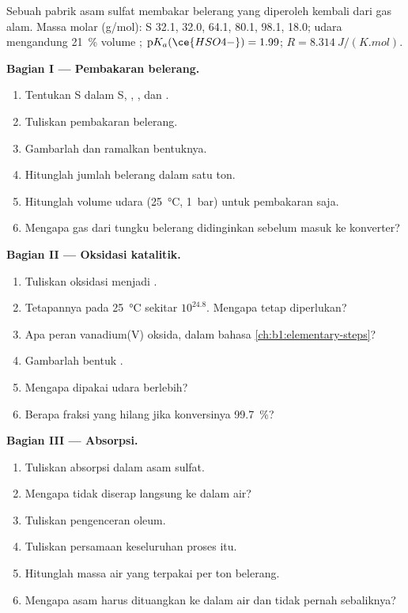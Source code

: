 \begin{problem}
\label{pb:b1:p-block-16-18:1}
Sebuah pabrik asam sulfat membakar belerang yang diperoleh kembali dari
gas alam. Massa molar (\unit{g/mol}): S 32.1,  32.0, 
64.1,  80.1,  98.1,  18.0; udara mengandung
\qty{21}{\percent} volume ; $\mathrm{p}K_a(\ce{HSO4-}) = 1.99$; $R =
\qty{8.314}{J/(K.mol)}$.

\medskip
\noindent\textbf{Bagian I --- Pembakaran belerang.}
\begin{enumerate}
  \item Tentukan  S dalam S, , , dan
        .
  \item Tuliskan pembakaran belerang.
  \item Gambarlah   dan ramalkan bentuknya.
  \item Hitunglah jumlah belerang dalam satu ton.
  \item Hitunglah volume udara (\qty{25}{\celsius}, \qty{1}{bar}) untuk
        pembakaran saja.
  \item Mengapa gas dari tungku belerang didinginkan sebelum masuk ke konverter?
\end{enumerate}

\medskip
\noindent\textbf{Bagian II --- Oksidasi katalitik.}
\begin{enumerate}[resume]
  \item Tuliskan oksidasi  menjadi .
  \item Tetapannya pada \qty{25}{\celsius} sekitar $10^{24.8}$. Mengapa
         tetap diperlukan?
  \item Apa peran vanadium(V) oksida, dalam bahasa
        \cref{ch:b1:elementary-steps}?
  \item Gambarlah bentuk .
  \item Mengapa dipakai udara berlebih?
  \item Berapa fraksi  yang hilang jika konversinya
        \qty{99.7}{\percent}?
\end{enumerate}

\medskip
\noindent\textbf{Bagian III --- Absorpsi.}
\begin{enumerate}[resume]
  \item Tuliskan absorpsi  dalam asam sulfat.
  \item Mengapa  tidak diserap langsung ke dalam air?
  \item Tuliskan pengenceran oleum.
  \item Tuliskan persamaan keseluruhan proses itu.
  \item Hitunglah massa air yang terpakai per ton belerang.
  \item Mengapa asam harus dituangkan ke dalam air dan tidak pernah
        sebaliknya?
\end{enumerate}


\end{problem}
